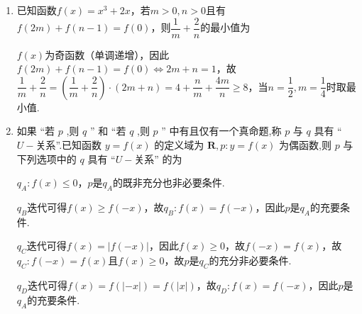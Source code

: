 \begin{enumerate}
\begin{enumerate}
\begin{jieda}
    \end{jieda}
    \item 已知函数$f(x) = x^3+2x$，若$m > 0, n>0$且有$f(2m)+f(n-1) = f(0)$，则$\dfrac{1}{m}+\dfrac{2}{n}$的最小值为
    \begin{jieda}
        $f(x)$为奇函数（单调递增），因此$f(2m)+f(n-1) = f(0) \Longleftrightarrow 2m+n=1$，故$\dfrac{1}{m}+\dfrac{2}{n} = \left(\dfrac{1}{m}+\dfrac{2}{n}\right) \cdot (2m+n) = 4+\dfrac{n}{m}+\dfrac{4m}{n} \geq 8$，当$n = \dfrac{1}{2}, m = \dfrac{1}{4}$时取最小值.
    \end{jieda}
    \item 如果 “若 $p$ ,则 $q$ ” 和 “若 $q$ ,则 $p$ ” 中有且仅有一个真命题,称 $p$ 与 $q$ 具有 “ $U-$关系”.已知函数 $y = f\left( x\right)$ 的定义域为 $\mathbf{R},p : y = f\left( x\right)$ 为偶函数,则 $p$ 与下列选项中的 $q$ 具有 “$U-$关系” 的为
    \begin{jieda}
        $q_A: f(x) \leq 0$，$p$是$q_A$的既非充分也非必要条件.

        $q_B$迭代可得$f(x) \geq f(-x)$，故$q_B: f(x) = f(-x)$，因此$p$是$q_A$的充要条件.

        $q_C$迭代可得$f(x) = |f(-x)|$，因此$f(x) \geq 0$，故$f(-x) = f(x)$，故$q_C: f(-x) = f(x)$且$f(x) \geq 0$，故$p$是$q_C$的充分非必要条件.

        $q_D$迭代可得$f(x) = f(|-x|) = f(|x|)$，故$q_D: f(x) = f(-x)$，因此$p$是$q_A$的充要条件.
    \end{jieda}

\end{enumerate}


\end{enumerate}
